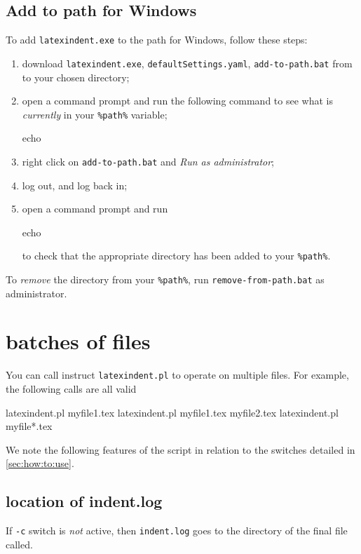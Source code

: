 	\subsection{Add to path for Windows}
		To add \texttt{latexindent.exe} to the path for Windows, follow these steps:
		\begin{enumerate}
			\item download \texttt{latexindent.exe}, \texttt{defaultSettings.yaml},
			      \texttt{add-to-path.bat} from \cite{latexindent-home} to your chosen directory;
			\item open a command prompt and run the following command to see what is \emph{currently} in
			      your \lstinline!%path%! variable;
			      \begin{dosprompt}
echo %
          \end{dosprompt}
			\item right click on \texttt{add-to-path.bat} and \emph{Run as administrator};
			\item log out, and log back in;
			\item open a command prompt and run
			      \begin{dosprompt}
echo %
          \end{dosprompt}
			      to check that the appropriate directory has been added to your \lstinline!%path%!.
		\end{enumerate}
		To \emph{remove} the directory from your \lstinline!%path%!, run
		\texttt{remove-from-path.bat} as administrator.

	\section{batches of files}

	 You can call  instruct \texttt{latexindent.pl} to operate
	 on multiple files. For example, the following calls are all valid
	 \begin{commandshell}
latexindent.pl myfile1.tex          
latexindent.pl myfile1.tex myfile2.tex
latexindent.pl myfile*.tex
        \end{commandshell}

	 We note the following features of the script in relation to the switches detailed in
	 \cref{sec:how:to:use}.

	\subsection{location of indent.log}
		If \texttt{-c} switch is \emph{not} active, then \texttt{indent.log} goes to the directory of the final file called.

